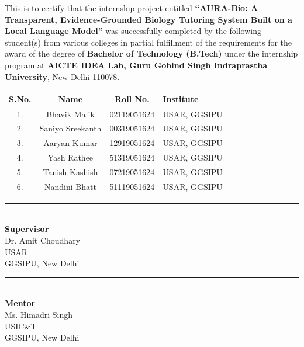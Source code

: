 \vspace{1cm}

This is to certify that the internship project entitled
\textbf{``AURA-Bio: A Transparent, Evidence-Grounded Biology Tutoring System Built on a Local Language Model''} was successfully completed by the following student(s) from various colleges in partial fulfillment of the requirements for the award of the degree of \textbf{Bachelor of Technology (B.Tech)} under the internship program at \textbf{AICTE IDEA Lab, Guru Gobind Singh Indraprastha University}, New Delhi-110078.

\vspace{1.2cm}

\begin{center}
\begin{tabular}{cccl}
\textbf{S.No.} & \textbf{Name} & \textbf{Roll No.} & \textbf{Institute} \\ \hline
1. & Bhavik Malik  &02119051624  & USAR, GGSIPU \\
2. & Saniyo Sreekanth  &00319051624  & USAR, GGSIPU \\
3. & Aaryan Kumar  &12919051624  & USAR, GGSIPU \\
4. & Yash Rathee  &51319051624  & USAR, GGSIPU \\
5. & Tanish Kashish  &07219051624  & USAR, GGSIPU \\
6. & Nandini Bhatt  &51119051624  & USAR, GGSIPU \\

\end{tabular}
\end{center}

\vspace{3cm}

\noindent
\begin{minipage}[t]{0.45\textwidth}
\centering
\rule{6cm}{0.4pt}\\
\textbf{Supervisor}\\
Dr. Amit Choudhary\\
USAR\\
GGSIPU, New Delhi
\end{minipage}
\hfill
\begin{minipage}[t]{0.45\textwidth}
\centering
\rule{6cm}{0.4pt}\\
\textbf{Mentor}\\
Ms. Himadri Singh\\
USIC\&T\\
GGSIPU, New Delhi
\end{minipage}

